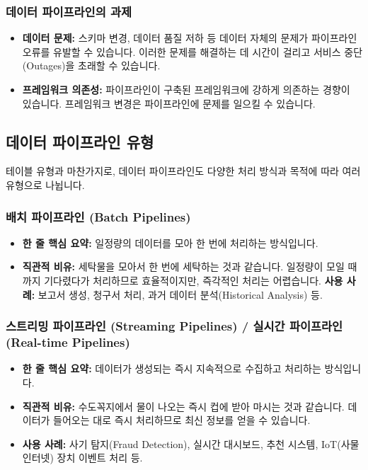 \documentclass[11pt,a4paper]{article}
\theoremstyle{definition}
\begin{document}
\subsubsection{데이터 파이프라인의 과제}
\begin{itemize}
    \item \textbf{데이터 문제:} 스키마 변경, 데이터 품질 저하 등 데이터 자체의 문제가 파이프라인 오류를 유발할 수 있습니다. 이러한 문제를 해결하는 데 시간이 걸리고 서비스 중단(Outages)을 초래할 수 있습니다.
    \item \textbf{프레임워크 의존성:} 파이프라인이 구축된 프레임워크에 강하게 의존하는 경향이 있습니다. 프레임워크 변경은 파이프라인에 문제를 일으킬 수 있습니다.
\end{itemize}

\subsection{데이터 파이프라인 유형}

테이블 유형과 마찬가지로, 데이터 파이프라인도 다양한 처리 방식과 목적에 따라 여러 유형으로 나뉩니다.

\subsubsection{배치 파이프라인 (Batch Pipelines)}
\begin{itemize}
    \item \textbf{한 줄 핵심 요약:} 일정량의 데이터를 모아 한 번에 처리하는 방식입니다.
    \item \textbf{직관적 비유:} 세탁물을 모아서 한 번에 세탁하는 것과 같습니다. 일정량이 모일 때까지 기다렸다가 처리하므로 효율적이지만, 즉각적인 처리는 어렵습니다.
    \textbf{사용 사례:} 보고서 생성, 청구서 처리, 과거 데이터 분석(Historical Analysis) 등.
\end{itemize}

\subsubsection{스트리밍 파이프라인 (Streaming Pipelines) / 실시간 파이프라인 (Real-time Pipelines)}
\begin{itemize}
    \item \textbf{한 줄 핵심 요약:} 데이터가 생성되는 즉시 지속적으로 수집하고 처리하는 방식입니다.
    \item \textbf{직관적 비유:} 수도꼭지에서 물이 나오는 즉시 컵에 받아 마시는 것과 같습니다. 데이터가 들어오는 대로 즉시 처리하므로 최신 정보를 얻을 수 있습니다.
    \item \textbf{사용 사례:} 사기 탐지(Fraud Detection), 실시간 대시보드, 추천 시스템, IoT(사물 인터넷) 장치 이벤트 처리 등.
\end{itemize}
\end{document}

